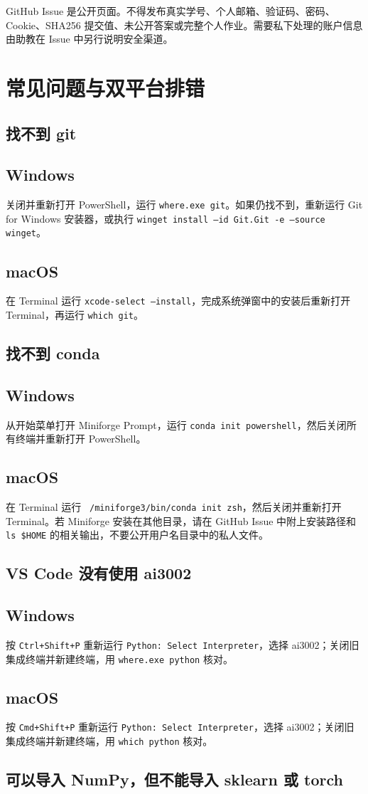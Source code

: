 \documentclass[11pt,a4paper]{article}
\newcommand{\windows}{\subsection*{\textcolor{windowsblue}{Windows}}}
\newcommand{\macos}{\subsection*{\textcolor{macgray}{macOS}}}
\begin{document}
\begin{importantbox}
GitHub Issue 是公开页面。不得发布真实学号、个人邮箱、验证码、密码、Cookie、SHA256 提交值、未公开答案或完整个人作业。需要私下处理的账户信息由助教在 Issue 中另行说明安全渠道。
\end{importantbox}

\section{常见问题与双平台排错}

\subsection*{找不到 git}

\windows
关闭并重新打开 PowerShell，运行 \texttt{where.exe git}。如果仍找不到，重新运行 Git for Windows 安装器，或执行 \texttt{winget install --id Git.Git -e --source winget}。

\macos
在 Terminal 运行 \texttt{xcode-select --install}，完成系统弹窗中的安装后重新打开 Terminal，再运行 \texttt{which git}。

\subsection*{找不到 conda}

\windows
从开始菜单打开 Miniforge Prompt，运行 \texttt{conda init powershell}，然后关闭所有终端并重新打开 PowerShell。

\macos
在 Terminal 运行 \texttt{~/miniforge3/bin/conda init zsh}，然后关闭并重新打开 Terminal。若 Miniforge 安装在其他目录，请在 GitHub Issue 中附上安装路径和 \texttt{ls \$HOME} 的相关输出，不要公开用户名目录中的私人文件。

\subsection*{VS Code 没有使用 ai3002}

\windows
按 \texttt{Ctrl+Shift+P} 重新运行 \texttt{Python: Select Interpreter}，选择 ai3002；关闭旧集成终端并新建终端，用 \texttt{where.exe python} 核对。

\macos
按 \texttt{Cmd+Shift+P} 重新运行 \texttt{Python: Select Interpreter}，选择 ai3002；关闭旧集成终端并新建终端，用 \texttt{which python} 核对。

\subsection*{可以导入 NumPy，但不能导入 sklearn 或 torch}
\end{document}
